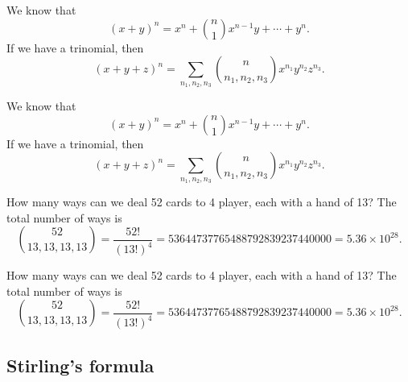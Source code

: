 \begin{note}
  \begin{field}
    \begin{eg}
      We know that
      \[
        (x + y)^n = x^n + \binom{n}{1}x^{n - 1}y + \cdots + y^n.
      \]
      If we have a trinomial, then
      \[
        (x + y + z)^n = \sum_{n_1, n_2, n_3} \binom{n}{n_1, n_2, n_3} x^{n_1}y^{n_2}z^{n_3}.
      \]
    \end{eg}
  \end{field}
  \begin{field}
    \begin{eg}
      We know that
      \[
        (x + y)^n = x^n + \binom{n}{1}x^{n - 1}y + \cdots + y^n.
      \]
      If we have a trinomial, then
      \[
        (x + y + z)^n = \sum_{n_1, n_2, n_3} \binom{n}{n_1, n_2, n_3} x^{n_1}y^{n_2}z^{n_3}.
      \]
    \end{eg}
  \end{field}
  \xplain{}%
\end{note}

\begin{note}
  \begin{field}
    \begin{eg}
      How many ways can we deal 52 cards to 4 player, each with a hand of 13? The total number of ways is
      \[
        \binom{52}{13, 13, 13, 13} = \frac{52!}{(13!)^4} = 53644737765488792839237440000 = 5.36\times 10^{28}.
      \]
    \end{eg}
  \end{field}
  \begin{field}
    \begin{eg}
      How many ways can we deal 52 cards to 4 player, each with a hand of 13? The total number of ways is
      \[
        \binom{52}{13, 13, 13, 13} = \frac{52!}{(13!)^4} = 53644737765488792839237440000 = 5.36\times 10^{28}.
      \]
    \end{eg}
  \end{field}
  \xplain{}%
\end{note}

\subsection{Stirling's formula}

